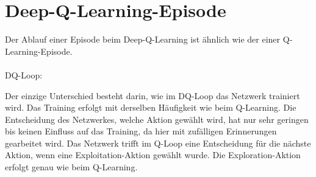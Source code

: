 \documentclass[12pt,titlepage]{article}
\begin{document}
\section{Deep-Q-Learning-Episode}
Der Ablauf einer Episode beim Deep-Q-Learning ist ähnlich wie der einer Q-Learning-Episode. 
\\\\
DQ-Loop:
\begin{center}
\end{center}
Der einzige Unterschied besteht darin, wie im DQ-Loop das Netzwerk trainiert wird. Das Training erfolgt mit derselben Häufigkeit wie beim Q-Learning. Die Entscheidung des Netzwerkes, welche Aktion gewählt wird, hat nur sehr geringen bis keinen Einfluss auf das Training, da hier mit zufälligen Erinnerungen gearbeitet wird. Das Netzwerk trifft im Q-Loop eine Entscheidung für die nächste Aktion, wenn eine Exploitation-Aktion gewählt wurde. Die Exploration-Aktion erfolgt genau wie beim Q-Learning.
\end{document}
